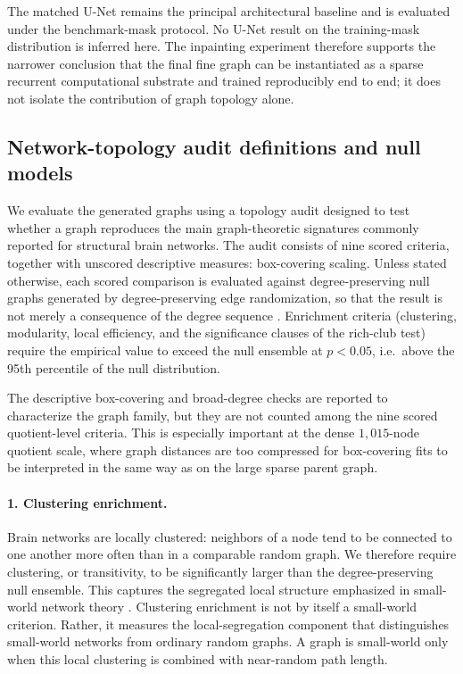 \documentclass[12pt]{article}
\begin{document}
The matched U-Net remains the principal architectural baseline and is evaluated
under the benchmark-mask protocol. No U-Net result on the training-mask
distribution is inferred here. The inpainting experiment therefore supports
the narrower conclusion that the final fine graph can be instantiated as a
sparse recurrent computational substrate and trained reproducibly end to end;
it does not isolate the contribution of graph topology alone.

\subsection{Network-topology audit definitions and null models}
\label{supp:topology-methods}


We evaluate the generated graphs using a topology audit designed to test
whether a graph reproduces the main graph-theoretic signatures commonly reported
for structural brain networks.  The audit consists of nine scored criteria,
together with  unscored descriptive measures: box-covering scaling. Unless
stated otherwise, each scored comparison is evaluated against
degree-preserving null graphs generated by degree-preserving edge randomization, so that the result is not merely a consequence of the degree sequence
\cite{MaslovSneppen2002,VasaMisic2022}.  Enrichment criteria (clustering, modularity, local efficiency, and the significance clauses of the rich-club test) require the empirical value to exceed the null ensemble at \(p<0.05\), i.e.\ above the 95th percentile of the null distribution.

The descriptive box-covering and broad-degree checks are reported to
characterize the graph family, but they are not counted among the nine scored
quotient-level criteria.  This is especially important at the dense
\(1{,}015\)-node quotient scale, where graph distances are too compressed for
box-covering fits to be interpreted in the same way as on the large sparse
parent graph.



\paragraph{1. Clustering enrichment.}
Brain networks are locally clustered: neighbors of a node tend to be
connected to one another more often than in a comparable random graph.
We therefore require clustering, or transitivity, to be significantly
larger than the degree-preserving null ensemble. This captures the
segregated local structure emphasized in small-world network theory
\cite{WattsStrogatz1998}.  Clustering enrichment is not by itself a small-world criterion. Rather,
it measures the local-segregation component that distinguishes
small-world networks from ordinary random graphs. A graph is small-world
only when this local clustering is combined with near-random path length. 
\end{document}
